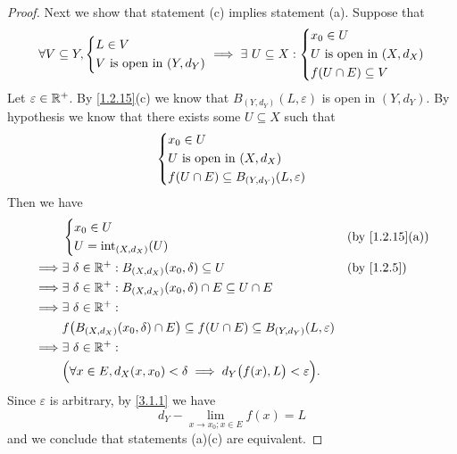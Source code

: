 \begin{proof}
  Next we show that statement (c) implies statement (a).
  Suppose that
  \[
    \forall V \subseteq Y, \begin{dcases}
      L \in V \\
      V \text{ is open in } (Y, d_Y)
    \end{dcases} \implies \exists\ U \subseteq X : \begin{dcases}
      x_0 \in U                      \\
      U \text{ is open in } (X, d_X) \\
      f(U \cap E) \subseteq V
    \end{dcases}
  \]
  Let \(\varepsilon \in \mathbb{R}^+\).
  By \cref{1.2.15}(c) we know that \(B_{(Y, d_Y)}(L, \varepsilon)\) is open in \((Y, d_Y)\).
  By hypothesis we know that there exists some \(U \subseteq X\) such that
  \[
    \begin{dcases}
      x_0 \in U                      \\
      U \text{ is open in } (X, d_X) \\
      f(U \cap E) \subseteq B_{(Y, d_Y)}(L, \varepsilon)
    \end{dcases}
  \]
  Then we have
  \begin{align*}
             & \begin{dcases}
                 x_0 \in U \\
                 U = \text{int}_{(X, d_X)}(U)
               \end{dcases}                                                                             &  & \text{(by \cref{1.2.15}(a))}             \\
    \implies & \exists\ \delta \in \R^+ : B_{(X, d_X)}(x_0, \delta) \subseteq U                                         &  & \text{(by \cref{1.2.5})} \\
    \implies & \exists\ \delta \in \R^+ : B_{(X, d_X)}(x_0, \delta) \cap E \subseteq U \cap E                                                         \\
    \implies & \exists\ \delta \in \R^+ :                                                                                                             \\
             & f\big(B_{(X, d_X)}(x_0, \delta) \cap E\big) \subseteq f(U \cap E) \subseteq B_{(Y, d_Y)}(L, \varepsilon)                               \\
    \implies & \exists\ \delta \in \R^+ :                                                                                                             \\
             & \Big(\forall x \in E, d_X(x, x_0) < \delta \implies d_Y\big(f(x), L\big) < \varepsilon\Big).
  \end{align*}
  Since \(\varepsilon\) is arbitrary, by \cref{3.1.1} we have
  \[
    d_Y - \lim_{x \to x_0 ; x \in E} f(x) = L
  \]
  and we conclude that statements (a)(c) are equivalent.


\end{proof}
